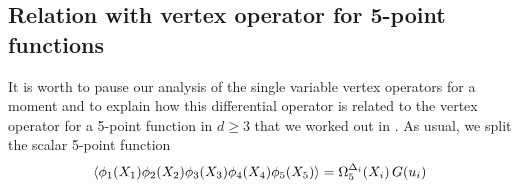 \documentclass{article}
\begin{document}
\subsection{Relation with vertex operator for 5-point functions}
\label{sect:shadowOPE}

It is worth to pause our analysis of the single variable vertex operators for a moment 
and to explain how this differential operator is related to the vertex operator for a 
5-point function in $d\geq 3$ that we worked out in \cite{Buric:2021ywo}. As usual, 
we split the scalar 5-point function 
\begin{equation}   \label{five_point_correlator}
    \expval{\phi_1(X_1)\phi_2(X_2)\phi_3(X_3)\phi_4(X_4)\phi_5(X_5)}=
    \Omega_5^{\Delta_i}(X_i)\, G(u_i)
    \end{equation} 
   
\end{document}
